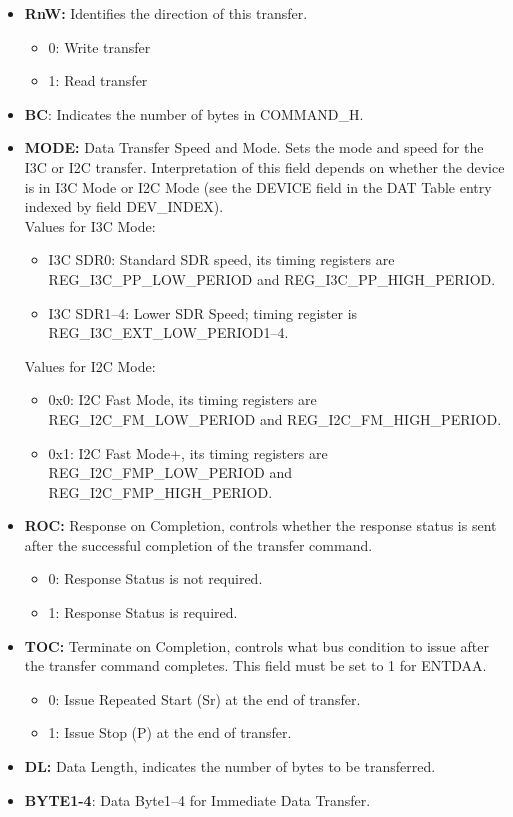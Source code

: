 \documentclass[main\_\_EN.tex]{subfiles}
\begin{document}
\begin{itemize}
    \item \textbf{RnW:} Identifies the direction of this transfer.
    \begin{itemize}
        \item 0: Write transfer
        \item 1: Read transfer
    \end{itemize}
    \item \textbf{BC}: Indicates the number of bytes in COMMAND\_H.
    \item \textbf{MODE:} Data Transfer Speed and Mode. Sets the mode and speed for the I3C or I2C transfer. Interpretation of this field depends on whether the device is in I3C Mode or I2C Mode (see the DEVICE field in the DAT Table entry indexed by field DEV\_INDEX).\\
    Values for I3C Mode:
    \begin{itemize}
        \item I3C SDR0: Standard SDR speed, its timing registers are REG\_I3C\_PP\_LOW\_PERIOD and REG\_I3C\_PP\_HIGH\_PERIOD.
        \item I3C SDR1–4: Lower SDR Speed; timing register is REG\_I3C\_EXT\_LOW\_PERIOD1–4.
    \end{itemize}
    Values for I2C Mode:
    \begin{itemize}
        \item 0x0: I2C Fast Mode, its timing registers are REG\_I2C\_FM\_LOW\_PERIOD and REG\_I2C\_FM\_HIGH\_PERIOD.
        \item 0x1: I2C Fast Mode+, its timing registers are REG\_I2C\_FMP\_LOW\_PERIOD and REG\_I2C\_FMP\_HIGH\_PERIOD.
    \end{itemize}
    \item \textbf{ROC:} Response on Completion, controls whether the response status is sent after the successful completion of the transfer command.
    \begin{itemize}
        \item 0: Response Status is not required.
        \item 1: Response Status is required.
    \end{itemize}
    \item \textbf{TOC:} Terminate on Completion, controls what bus condition to issue after the transfer command completes. This field must be set to 1 for ENTDAA.
    \begin{itemize}
        \item 0: Issue Repeated Start (Sr) at the end of transfer.
        \item 1: Issue Stop (P) at the end of transfer.
    \end{itemize}
    \item \textbf{DL:} Data Length, indicates the number of bytes to be transferred.
    \item \textbf{BYTE1-4}: Data Byte1–4 for Immediate Data Transfer.
\end{itemize}
\end{document}
